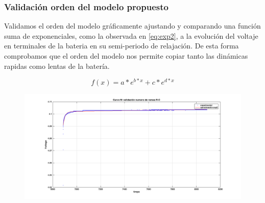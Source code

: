 \documentclass[10pt]{beamer}
\theoremstyle{remark}
\theoremstyle{definition}
\begin{document}
\begin{frame}
  \frametitle{Validación orden del modelo propuesto}

  Validamos el orden del modelo gráficamente ajustando y comparando una función 
  suma de exponenciales, como la observada en \ref{eq:exp2}, a la evolución del 
  voltaje en terminales de la bateria en su semi-periodo de relajación. De esta 
  forma comprobamos que el orden del modelo nos permite copiar tanto las 
  dinámicas rapidas como lentas de la batería. 

  \begin{equation}
	f(x) = a*e^{b*x} + c*e^{d*x}
	\label{eq:exp2}
  \end{equation}

  \begin{figure}
	\centering
	\includegraphics[width=0.9\linewidth]{images/exp_ord_2_val.png}
	\caption{}
	\label{fig:val_exp2}
  \end{figure}

\end{frame}
\end{document}
